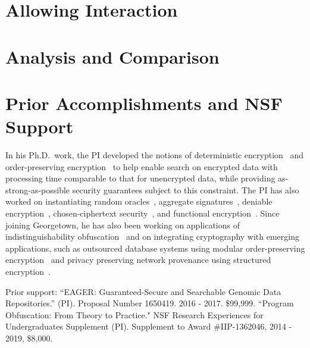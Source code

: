 \documentclass[11pt]{article}
\theoremstyle{remark}
\begin{document}
%

\section{Allowing Interaction}
\label{sec:interactive}





\section{Analysis and Comparison}
\label{sec:analysis}


\section{Prior Accomplishments and NSF Support}

In his Ph.D.~work, the PI  developed the notions of deterministic encryption~\cite{C:BelBolONe07,Amanatidis2007,C:BolFehONe08,C:BFOR08,TCC:FulNeiRey12} and order-preserving encryption~\cite{EC:BCLO09,C:BolCheONe11} to help enable search on encrypted data with processing time comparable to that for unencrypted data, while providing as-strong-as-possible security guarantees subject to this constraint.
The PI has also worked on  instantiating random oracles~\cite{C:KilOneSmi10,TCC:GoyONeRao11,EC:LewONeSmi13},   aggregate signatures~\cite{CCS:BGOY07,AC:GLOW12}, deniable encryption~\cite{C:OnePeiWat11},  chosen-ciphertext security~\cite{EC:KilMohOne10,PKC:DFMO14}, and  functional encryption~\cite{EPRINT:ONeill10b,C:DIJOPP13, CANS:BelONe13}.   %
Since joining Georgetown, he has also been working on  applications of indistinguishability obfuscation~\cite{PKC:DGLOZ16} and on integrating cryptography with emerging applications, such as outsourced database systems using modular order-preserving encryption~\cite{mavroforakis2015modular} and  privacy preserving network provenance using structured encryption~\cite{zhang2017privacy}.


Prior support: ``EAGER: Guaranteed-Secure and Searchable Genomic Data Repositories.'' (PI). Proposal Number 1650419.  2016 - 2017. \$99,999.
``Program Obfuscation: From Theory to Practice." NSF Research Experiences for Undergraduates Supplement (PI).
Supplement to Award \#IIP-1362046,   2014 - 2019, \$8,000.
\end{document}
